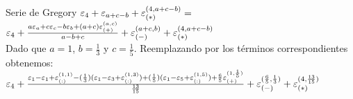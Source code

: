 \begin{section}{Serie de Gregory}
	$\ev{4} + \ev{a+c-b} + \er{*}{4,a+c-b} =$\\
	
	$\ev{4} + \frac{a\ev{a} + c\ev{c} - b\ev{b} + (a+c)\er{+}{a,c}}{a-b+c} + \er{-}{a+c,b} + \er{*}{4,a+c-b}$\\
	
	Dado que $a=1$, $b=\frac{1}{3}$ y $c=\frac{1}{5}$. Reemplazando por los términos correspondientes obtenemos:\\
	
	$\ev{4} + \frac{\ev{1} - \ev{1} + \er{:}{1,1} - (\frac{1}{3})(\ev{1} - \ev{3} + \er{:}{1,3}) + (\frac{1}{5})(\ev{1} - \ev{5} + \er{:}{1,5}) + \frac{6}{5} \er{+}{1,\frac{1}{5}}}{\frac{13}{15}} + \er{-}{\frac{6}{5},\frac{1}{3}} + \er{*}{4,\frac{13}{15}}$\\
\end{section}
